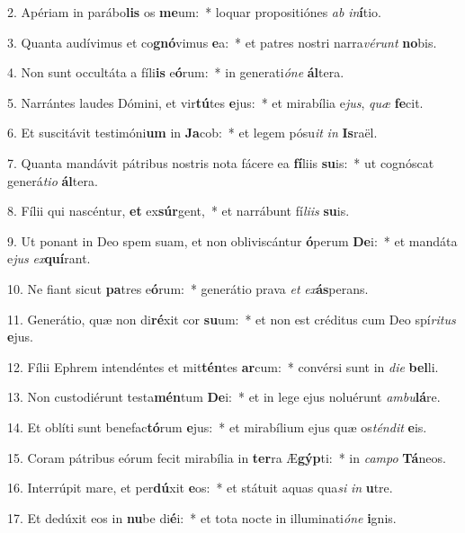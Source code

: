 2. Apériam in parábo\textbf{lis} os \textbf{me}um:~*  loquar propositiónes \textit{ab} \textit{in}\textbf{í}tio.\

3. Quanta audívimus et co\textbf{gnó}vimus \textbf{e}a:~*  et patres nostri narra\textit{vé}\textit{runt} \textbf{no}bis.\

4. Non sunt occultáta a fíli\textbf{is} e\textbf{ó}rum:~*  in generati\textit{ó}\textit{ne} \textbf{ál}tera.\

5. Narrántes laudes Dómini, et vir\textbf{tú}tes \textbf{e}jus:~*  et mirabília e\textit{jus}, \textit{quæ} \textbf{fe}cit.\

6. Et suscitávit testimóni\textbf{um} in \textbf{Ja}cob:~*  et legem pósu\textit{it} \textit{in} \textbf{Is}raël.\

7. Quanta mandávit pátribus nostris nota fácere ea \textbf{fí}liis \textbf{su}is:~*  ut cognóscat generá\textit{ti}\textit{o} \textbf{ál}tera.\

8. Fílii qui nascéntur, \textbf{et} ex\textbf{súr}gent,~*  et narrábunt fí\textit{li}\textit{is} \textbf{su}is.\

9. Ut ponant in Deo spem suam, et non obliviscántur \textbf{ó}perum \textbf{De}i:~*  et mandáta e\textit{jus} \textit{ex}\textbf{quí}rant.\

10. Ne fiant sicut \textbf{pa}tres e\textbf{ó}rum:~*  generátio prava \textit{et} \textit{ex}\textbf{ás}perans.\

11. Generátio, quæ non di\textbf{ré}xit cor \textbf{su}um:~*  et non est créditus cum Deo spí\textit{ri}\textit{tus} \textbf{e}jus.\

12. Fílii Ephrem intendéntes et mit\textbf{tén}tes \textbf{ar}cum:~*  convérsi sunt in \textit{di}\textit{e} \textbf{bel}li.\

13. Non custodiérunt testa\textbf{mén}tum \textbf{De}i:~*  et in lege ejus noluérunt \textit{am}\textit{bu}\textbf{lá}re.\

14. Et oblíti sunt benefac\textbf{tó}rum \textbf{e}jus:~*  et mirabílium ejus quæ os\textit{tén}\textit{dit} \textbf{e}is.\

15. Coram pátribus eórum fecit mirabília in \textbf{ter}ra Æ\textbf{gýp}ti:~*  in \textit{cam}\textit{po} \textbf{Tá}neos.\

16. Interrúpit mare, et per\textbf{dú}xit \textbf{e}os:~*  et státuit aquas qua\textit{si} \textit{in} \textbf{u}tre.\

17. Et dedúxit eos in \textbf{nu}be di\textbf{é}i:~*  et tota nocte in illuminati\textit{ó}\textit{ne} \textbf{i}gnis.\

